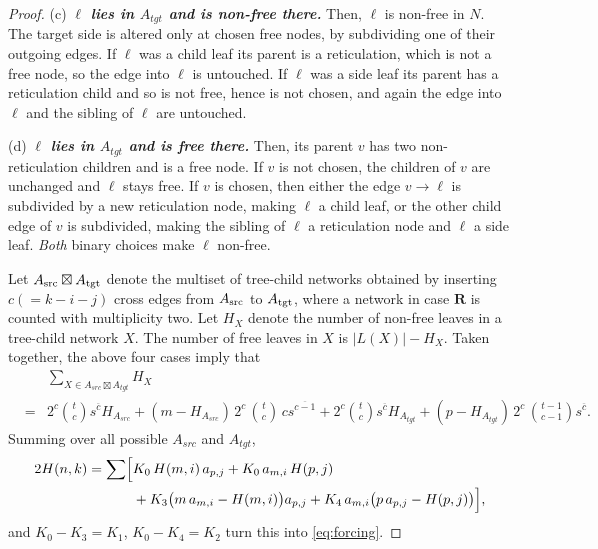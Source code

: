 \documentclass[11pt]{article}
\theoremstyle{definition}
\theoremstyle{remark}
\newtheorem{remark}[theorem]{Remark}
\newcommand{\rise}[2]{#1^{\overline{#2}}}
\begin{document}
\begin{proof}
(c) \emph{\bf $\ell$ lies in $A_{tgt}$ and is non-free there.} Then,  $\ell$ is non-free in $N$. The target side
is altered only at chosen free nodes, by subdividing one of their outgoing edges. If
$\ell$ was a child leaf its parent is a reticulation, which is not a free node, so the
edge into $\ell$ is untouched. If $\ell$ was a side leaf its parent has a reticulation child
and so is not free, hence is not chosen, and again the edge into $\ell$ and the sibling of
$\ell$ are untouched. 


(d) \emph{\bf $\ell$ lies in $A_{tgt}$ and is free there.} Then,  its parent $v$ has two
non-reticulation children and is a free node.
If $v$ is not
chosen, the children of $v$ are unchanged and $\ell$ stays free. If $v$ is chosen, then
either the edge $v\to\ell$ is subdivided by a new reticulation node, making $\ell$ a child leaf,
or the other child edge of $v$ is subdivided, making the sibling of $\ell$ a reticulation node
and $\ell$ a side leaf. \emph{Both} binary choices make $\ell$ non-free. 


 Let $A_{\rm src}\boxtimes A_{\rm tgt}$ denote the multiset of tree-child networks obtained by inserting $c(=k-i-j)$ cross edges from $A_{\rm src}$ to $A_{\rm tgt}$, where a network in case $\mathbf R$ is counted with multiplicity two.
Let $H_{X}$ denote the number of non-free leaves in a tree-child network $X$. The number of free leaves in $X$ is
$\vert L(X)\vert -H_X$.
Taken together, the above four cases imply that
\begin{eqnarray*}
   && \sum_{X\in A_{src}\boxtimes A_{tgt}}H_X \\
   &=& 2^c{t\choose c}\rise {s}{c} H_{A_{src}}
    +(m-H_{A_{src}})\,2^c\,{t\choose c}\,c\rise s{c-1}
    +2^c{t\choose c}\rise {s}{c} H_{A_{tgt}}
    + (p-H_{A_{tgt}})\,2^c\,{t-1\choose c-1}\rise s{c}.
\end{eqnarray*}
Summing over all possible $A_{src}$ and $A_{tgt}$, 
\begin{align*}
  2H(n,k)=\sum\Bigl[&K_0\,H(m,i)\,a_{p, j}+K_0\,a_{m, i}\,H(p,j)\\
  &+K_3\bigl(m\,a_{m, i}-H(m,i)\bigr)a_{p, j}
   +K_4\,a_{m, i}\bigl(p\,a_{p, j}-H(p,j)\bigr)\Bigr],
\end{align*}
and $K_0-K_3=K_1$, $K_0-K_4=K_2$ turn this into \eqref{eq:forcing}.
\end{proof}

\end{document}
